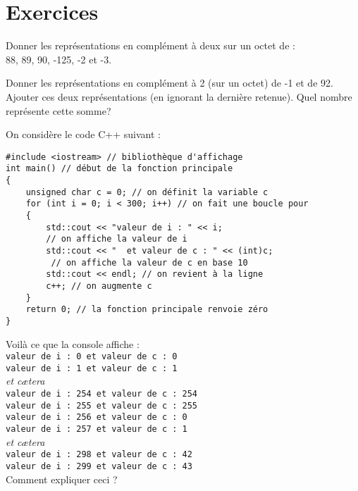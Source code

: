 \section{Exercices}

\begin{exercice}
    Donner les représentations en complément à deux sur un octet de :\\ 88, 89, 90, -125, -2 et -3.
\end{exercice}

\begin{exercice}
    Donner les représentations en complément à 2 (sur un octet) de -1 et de 92.\\
    Ajouter ces deux représentations (en ignorant la dernière retenue). Quel nombre représente cette somme?\\
\end{exercice}



\begin{exercice}
    On considère le code \textsc{C++} suivant :

    \begin{verbatim}
#include <iostream> // bibliothèque d'affichage
int main() // début de la fonction principale
{
    unsigned char c = 0; // on définit la variable c
    for (int i = 0; i < 300; i++) // on fait une boucle pour
    {
        std::cout << "valeur de i : " << i;
        // on affiche la valeur de i
        std::cout << "  et valeur de c : " << (int)c;
         // on affiche la valeur de c en base 10
        std::cout << endl; // on revient à la ligne
        c++; // on augmente c
    }
    return 0; // la fonction principale renvoie zéro
}
\end{verbatim}

    Voilà ce que la console affiche :\\

    \texttt{valeur de i : 0  et valeur de c : 0}\\
    \texttt{valeur de i : 1  et valeur de c : 1}\\
    \textit{et c\ae tera}\\
    \texttt{valeur de i : 254  et valeur de c : 254}\\
    \texttt{valeur de i : 255  et valeur de c : 255}\\
    \texttt{valeur de i : 256  et valeur de c : 0}\\
    \texttt{valeur de i : 257  et valeur de c : 1}\\
    \textit{et c\ae tera}\\
    \texttt{valeur de i : 298  et valeur de c : 42}\\
    \texttt{valeur de i : 299  et valeur de c : 43}\\

    Comment expliquer ceci ?

\end{exercice}


